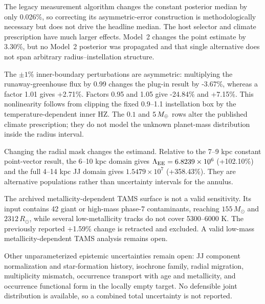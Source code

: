 The legacy measurement algorithm changes the constant posterior median by only
0.026\%, so correcting its asymmetric-error construction is methodologically
necessary but does not drive the headline median. The host selector and climate
prescription have much larger effects. Model~2 changes the point estimate by
3.30\%, but no Model~2 posterior was propagated and that single alternative
does not span arbitrary radius--instellation structure.

The $\pm1\%$ inner-boundary perturbations are asymmetric: multiplying the
runaway-greenhouse flux by 0.99 changes the plug-in result by -3.67\%, whereas
a factor 1.01 gives +2.71\%. Factors 0.95 and 1.05 give -24.84\% and +7.15\%.
This nonlinearity follows from clipping the fixed 0.9--1.1 instellation box by
the temperature-dependent inner HZ. The $0.1$ and $5\,M_{\oplus}$ rows alter the
published climate prescription; they do not model the unknown planet-mass
distribution inside the radius interval.

Changing the radial mask changes the estimand. Relative to the 7--9 kpc
constant point-vector result, the 6--10 kpc domain gives
$\Lambda_{\rm EE}=6.8239\times10^6$ (+102.10\%) and the full 4--14 kpc JJ domain gives
$1.5479\times10^7$ (+358.43\%). They are alternative populations rather than
uncertainty intervals for the annulus.

The archived metallicity-dependent TAMS surface is not a valid sensitivity.
Its input contains 42 giant or high-mass phase-7 contaminants, reaching
$155\,M_\odot$ and $2312\,R_\odot$, while several low-metallicity tracks do not
cover 5300--6000 K. The previously reported +1.59\% change is retracted and
excluded. A valid low-mass metallicity-dependent TAMS analysis remains open.

Other unparameterized epistemic uncertainties remain open: JJ component
normalization and star-formation history, isochrone family, radial migration,
multiplicity mismatch, occurrence transport with age and metallicity, and
occurrence functional form in the locally empty target. No defensible joint
distribution is available, so a combined total uncertainty is not reported.
